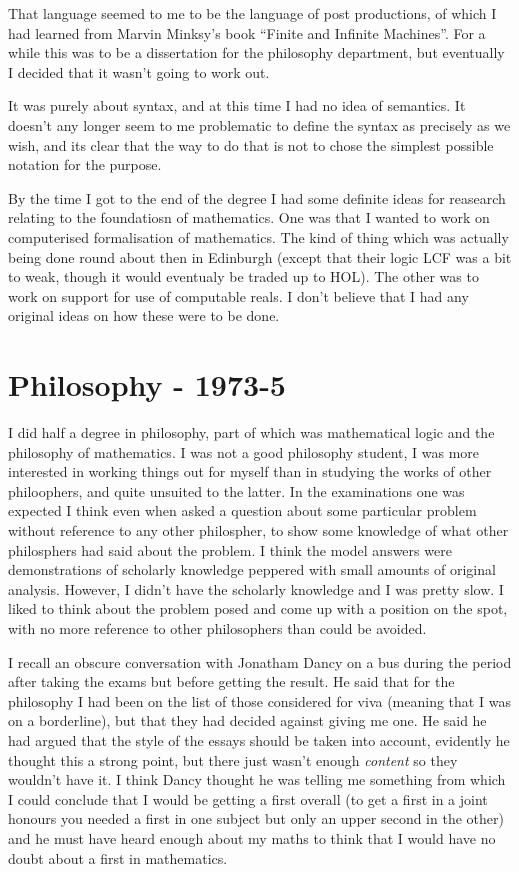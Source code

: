 \documentclass[10pt,titlepage]{book}
\begin{document}
That language seemed to me to be the language of post productions, of which I had learned from Marvin Minksy's book ``Finite and Infinite Machines''.
For a while this was to be a dissertation for the philosophy department, but eventually I decided that it wasn't going to work out.

It was purely about syntax, and at this time I had no idea of semantics.
It doesn't any longer seem to me problematic to define the syntax as precisely as we wish, and its clear that the way to do that is not to chose the simplest possible notation for the purpose.

By the time I got to the end of the degree I had some definite ideas for reasearch relating to the foundatiosn of mathematics.
One was that I wanted to work on computerised formalisation of mathematics.
The kind of thing which was actually being done round about then in Edinburgh (except that their logic LCF was a bit to weak, though it would eventualy be traded up to HOL).
The other was to work on support for use of computable reals.
I don't believe that I had any original ideas on how these were to be done.

\section{Philosophy - 1973-5}

I did half a degree in philosophy, part of which was mathematical logic and the philosophy of mathematics.
I was not a good philosophy student, I was more interested in working things out for myself than in studying the works of other philoophers, and quite unsuited to the latter.
In the examinations one was expected I think even when asked a question about some particular problem without reference to any other philospher, to show some knowledge of what other philosphers had said about the problem.
I think the model answers were demonstrations of scholarly knowledge peppered with small amounts of original analysis.
However, I didn't have the scholarly knowledge and I was pretty slow.
I liked to think about the problem posed and come up with a position on the spot, with no more reference to other philosophers than could be avoided.

I recall an obscure conversation with Jonatham Dancy on a bus during the period after taking the exams but before getting the result.
He said that for the philosophy I had been on the list of those considered for viva (meaning that I was on a borderline), but that they had decided against giving me one.
He said he had argued that the style of the essays should be taken into account, evidently he thought this a strong point, but there just wasn't enough {\it content} so they wouldn't have it.
I think Dancy thought he was telling me something from which I could conclude that I would be getting a first overall (to get a first in a joint honours you needed a first in one subject but only an upper second in the other) and he must have heard enough about my maths to think that I would have no doubt about a first in mathematics.
\end{document}
